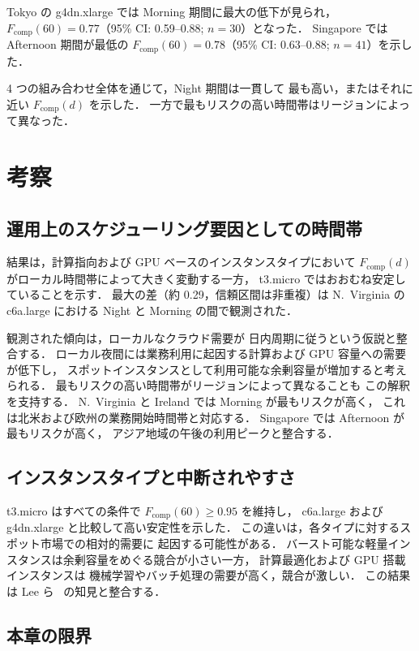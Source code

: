 \documentclass[11pt,a4paper]{ltjsreport}
\newcommand{\Fcomp}{F_{\mathrm{comp}}}
\begin{document}
Tokyo の g4dn.xlarge では Morning 期間に最大の低下が見られ，
$\Fcomp(60) = 0.77$（95\% CI: 0.59--0.88; $n=30$）となった．
Singapore では Afternoon 期間が最低の
$\Fcomp(60) = 0.78$（95\% CI: 0.63--0.88; $n=41$）を示した．

4 つの組み合わせ全体を通じて，Night 期間は一貫して
最も高い，またはそれに近い $\Fcomp(d)$ を示した．
一方で最もリスクの高い時間帯はリージョンによって異なった．

\section{考察}

\subsection{運用上のスケジューリング要因としての時間帯}

結果は，計算指向および GPU ベースのインスタンスタイプにおいて
$\Fcomp(d)$ がローカル時間帯によって大きく変動する一方，
t3.micro ではおおむね安定していることを示す．
最大の差（約 0.29，信頼区間は非重複）は
N.~Virginia の c6a.large における Night と Morning の間で観測された．

観測された傾向は，ローカルなクラウド需要が
日内周期に従うという仮説と整合する．
ローカル夜間には業務利用に起因する計算および GPU 容量への需要が低下し，
スポットインスタンスとして利用可能な余剰容量が増加すると考えられる．
最もリスクの高い時間帯がリージョンによって異なることも
この解釈を支持する．
N.~Virginia と Ireland では Morning が最もリスクが高く，
これは北米および欧州の業務開始時間帯と対応する．
Singapore では Afternoon が最もリスクが高く，
アジア地域の午後の利用ピークと整合する．

\subsection{インスタンスタイプと中断されやすさ}

t3.micro はすべての条件で $\Fcomp(60) \geq 0.95$ を維持し，
c6a.large および g4dn.xlarge と比較して高い安定性を示した．
この違いは，各タイプに対するスポット市場での相対的需要に
起因する可能性がある．
バースト可能な軽量インスタンスは余剰容量をめぐる競合が小さい一方，
計算最適化および GPU 搭載インスタンスは
機械学習やバッチ処理の需要が高く，競合が激しい．
この結果は Lee ら~\cite{Lee2022SpotLake} の知見と整合する．

\subsection{本章の限界}
\label{sec:limit_ch4}
\end{document}
